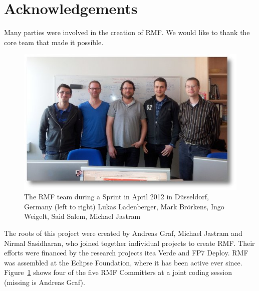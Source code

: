 % 

\section{Acknowledgements}

Many parties were involved in the creation of RMF.  We would like to thank the core team that made it possible.

\begin{figure}[H]
  \centering
  \includegraphics[width=\textwidth]{../rmf-images/2012_03_sprint_team.jpg}
  \caption{The RMF team during a Sprint in April 2012 in Düsseldorf, Germany (left to right) Lukas Ladenberger, Mark Brörkens, Ingo Weigelt, Said Salem, Michael Jastram}
  \label{fig:intro_core_team}
\end{figure}

The roots of this project were created by Andreas Graf, Michael Jastram and Nirmal Sasidharan, who joined together individual projects to create RMF.  Their efforts were financed by the research projects itea Verde and FP7 Deploy.  RMF was assembled at the Eclipse Foundation, where it has been active ever since.  Figure~\ref{fig:intro_core_team} shows four of the five RMF Committers at a joint coding session (missing is Andreas Graf).

